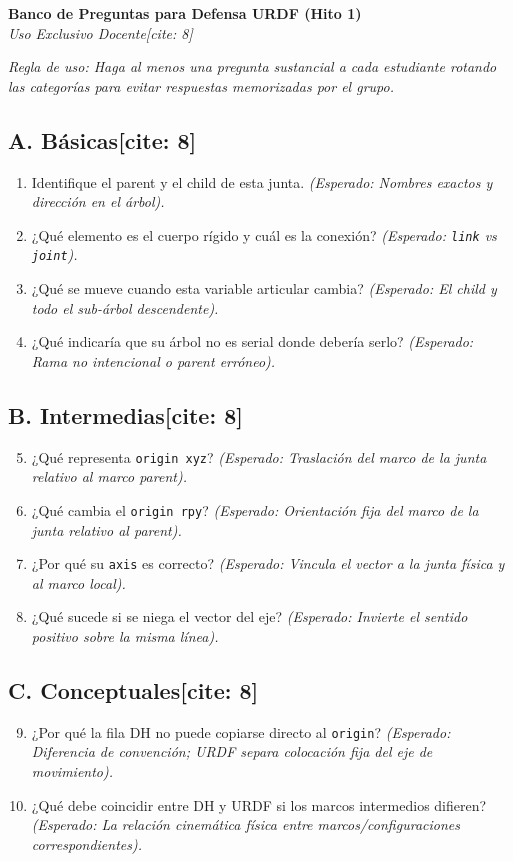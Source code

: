 \documentclass[11pt, a4paper]{article}
\begin{document}
\begin{center}
    \Large\textbf{Banco de Preguntas para Defensa URDF (Hito 1)}\\[0.2cm]
    \normalsize \textit{Uso Exclusivo Docente[cite: 8]}
\end{center}

\textit{Regla de uso: Haga al menos una pregunta sustancial a cada estudiante rotando las categorías para evitar respuestas memorizadas por el grupo.}

\subsection*{A. Básicas[cite: 8]}
\begin{enumerate}
    \item Identifique el parent y el child de esta junta. \textit{(Esperado: Nombres exactos y dirección en el árbol).}
    \item ¿Qué elemento es el cuerpo rígido y cuál es la conexión? \textit{(Esperado: \texttt{link} vs \texttt{joint}).}
    \item ¿Qué se mueve cuando esta variable articular cambia? \textit{(Esperado: El child y todo el sub-árbol descendente).}
    \item ¿Qué indicaría que su árbol no es serial donde debería serlo? \textit{(Esperado: Rama no intencional o parent erróneo).}
\end{enumerate}

\subsection*{B. Intermedias[cite: 8]}
\begin{enumerate}
    \setcounter{enumi}{4}
    \item ¿Qué representa \texttt{origin xyz}? \textit{(Esperado: Traslación del marco de la junta relativo al marco parent).}
    \item ¿Qué cambia el \texttt{origin rpy}? \textit{(Esperado: Orientación fija del marco de la junta relativo al parent).}
    \item ¿Por qué su \texttt{axis} es correcto? \textit{(Esperado: Vincula el vector a la junta física y al marco local).}
    \item ¿Qué sucede si se niega el vector del eje? \textit{(Esperado: Invierte el sentido positivo sobre la misma línea).}
\end{enumerate}

\subsection*{C. Conceptuales[cite: 8]}
\begin{enumerate}
    \setcounter{enumi}{8}
    \item ¿Por qué la fila DH no puede copiarse directo al \texttt{origin}? \textit{(Esperado: Diferencia de convención; URDF separa colocación fija del eje de movimiento).}
    \item ¿Qué debe coincidir entre DH y URDF si los marcos intermedios difieren? \textit{(Esperado: La relación cinemática física entre marcos/configuraciones correspondientes).}
\end{enumerate}
\end{document}

